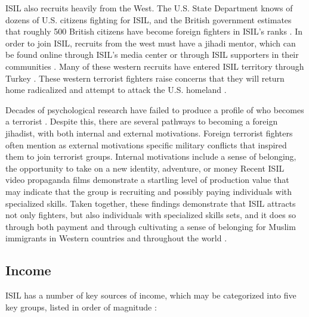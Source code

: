 \documentclass{report}
\begin{document}
ISIL also recruits heavily from the West. The U.S. State Department knows of dozens of U.S. citizens fighting for ISIL, and the British government estimates that roughly 500 British citizens have become foreign fighters in ISIL's ranks \cite{Masi2014a}.  In order to join ISIL, recruits from the west must have a jihadi mentor, which can be found online through ISIL's media center or through ISIL supporters in their communities \cite{Masi2014a}.  Many of these western recruits have entered ISIL territory through Turkey \cite{Masi2014a}.  These western terrorist fighters raise concerns that they will return home radicalized and attempt to attack the U.S. homeland \cite{Patrick2014}. 

Decades of psychological research have failed to produce a profile of who becomes a terrorist \cite{Stern2015}. Despite this, there are several pathways to becoming a foreign jihadist, with both internal and external motivations. Foreign terrorist fighters often mention as external motivations specific military conflicts that inspired them to join terrorist groups. Internal motivations include a sense of belonging, the opportunity to take on a new identity, adventure, or money \cite{Stern2015} Recent ISIL video propaganda films demonstrate a startling level of production value that may indicate that the group is recruiting and possibly paying individuals with specialized skills. Taken together, these findings demonstrate that ISIL attracts not only fighters, but also individuals with specialized skills sets, and it does so through both payment and through cultivating a sense of belonging for Muslim immigrants in Western countries and throughout the world \cite{Patrick2014}. 



\subsection{Income}

ISIL has a number of key sources of income, which may be categorized into five key groups, listed in order of magnitude \cite{Report2015}:
\end{document}
